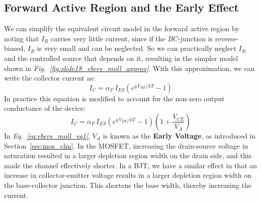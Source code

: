 \subsection{Forward Active Region and the Early Effect}
We can simplify the equivalent circuit model in the forward active region by noting that $I_R$ carries very little current, since if the $BC$-junction is reverse-biased, $I_R$ is very small and can be neglected.  So we can practically neglect $I_R$ and the controlled source that depends on it, resulting in the simpler model shown in \emph{Fig.~\ref{fig:slide18_ebers_moll_approx}}.  With this approximation, we can write the collector current as:
    \begin{equation}
        I_C = \alpha_F\,I_{ES} \left(e^{q\,V_{BE}/kT} - 1\right)
    \end{equation}
In practice this equation is modified to account for the non-zero output conductance of the device:
    \begin{equation}
        I_C = \alpha_F\,I_{ES} \left(e^{q\,V_{BE}/kT} - 1\right) \left(1 + \frac{V_{CE}}{V_A}\right)
        \label{ebers_moll_output_conductance}
    \end{equation}
In \emph{Eq.~\ref{eq:ebers_moll_eq1}}, $V_A$ is known as the \textbf{Early Voltage}, as introduced in Section~\ref{sec:mos_clm}.  In the MOSFET, increasing the drain-source voltage in saturation resulted in a larger depletion region width on the drain side, and this made the channel effectively shorter.  In a BJT, we have a similar effect in that an increase in collector-emitter voltage results in a larger depletion region width on the base-collector junction.  This shortens the base width, thereby increasing the current.
\newpage
